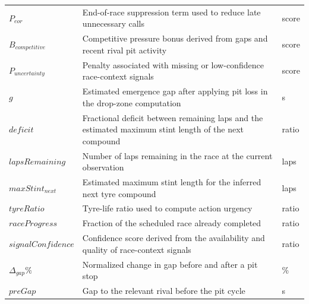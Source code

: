 \documentclass{Configuration_Files/PoliMi3i_thesis}
\begin{document}
\begin{longtable}{p{}p{}p{}}
    $P_{eor}$          & End-of-race suppression term used to reduce late unnecessary calls                                    & score         \\

    $B_{competitive}$  & Competitive pressure bonus derived from gaps and recent rival pit activity                            & score         \\

    $P_{uncertainty}$  & Penalty associated with missing or low-confidence race-context signals                                & score         \\

    $g$                & Estimated emergence gap after applying pit loss in the drop-zone computation                          & s             \\

    $deficit$          & Fractional deficit between remaining laps and the estimated maximum stint length of the next compound & ratio         \\

    $lapsRemaining$    & Number of laps remaining in the race at the current observation                                       & laps          \\

    $maxStint_{next}$  & Estimated maximum stint length for the inferred next tyre compound                                    & laps          \\

    $tyreRatio$        & Tyre-life ratio used to compute action urgency                                                        & ratio         \\

    $raceProgress$     & Fraction of the scheduled race already completed                                                      & ratio         \\

    $signalConfidence$ & Confidence score derived from the availability and quality of race-context signals                    & ratio         \\

    $\Delta_{gap}\%$   & Normalized change in gap before and after a pit stop                                                  & \%            \\

    $preGap$           & Gap to the relevant rival before the pit cycle                                                        & s             \\


\end{longtable}
\end{document}
